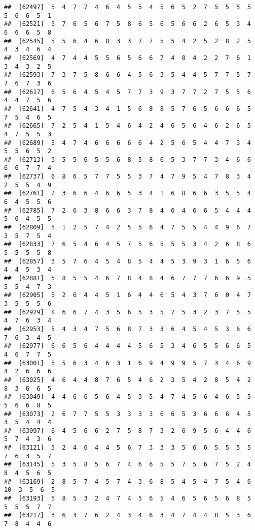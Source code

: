 \documentclass[
]{book}
\begin{document}
\begin{verbatim}
##  [62497]  5  4  7  7  4  6  4  5  5  4  5  6  5  2  7  5  5  5  5  5  6  6  5  1
##  [62521]  3  7  6  5  6  7  5  8  6  5  6  5  6  6  2  6  5  3  4  6  6  6  5  8
##  [62545]  5  5  6  4  6  8  3  3  7  7  5  5  4  2  5  2  8  2  5  4  3  4  6  4
##  [62569]  4  7  4  4  5  5  6  5  6  6  7  4  8  4  2  2  7  6  1  3  4  3  2  5
##  [62593]  7  3  7  5  8  6  6  4  5  6  3  5  4  4  5  7  7  5  7  7  6  7  3  6
##  [62617]  6  5  6  4  5  4  5  7  7  3  9  3  7  7  2  7  5  5  6  4  4  7  5  6
##  [62641]  4  7  5  4  3  4  1  5  6  8  8  5  7  6  5  6  6  6  5  7  5  4  6  5
##  [62665]  7  2  5  4  1  5  4  6  4  2  4  6  5  6  4  6  2  6  5  4  7  5  5  3
##  [62689]  5  4  7  4  6  6  6  6  6  4  2  5  6  5  4  4  7  3  4  5  5  6  5  2
##  [62713]  3  5  5  6  5  5  6  8  5  8  6  5  3  7  7  3  4  6  6  6  6  7  7  4
##  [62737]  6  8  6  5  7  7  5  5  3  7  4  7  9  5  4  7  8  3  4  2  5  5  4  9
##  [62761]  2  3  6  6  4  6  6  5  3  4  1  6  8  6  6  3  5  5  4  6  4  5  5  6
##  [62785]  7  2  6  3  8  6  6  3  7  8  4  6  4  6  6  5  4  4  4  5  6  4  5  5
##  [62809]  5  1  2  5  7  4  2  5  5  6  4  7  5  5  4  4  9  6  7  3  5  7  5  4
##  [62833]  7  6  5  4  6  4  5  7  5  6  5  5  5  3  4  2  6  8  6  5  5  5  5  8
##  [62857]  3  5  7  6  4  5  4  8  5  4  4  5  3  9  3  1  6  5  6  4  4  5  3  4
##  [62881]  5  8  5  5  4  6  7  8  4  8  4  6  7  7  7  6  6  9  5  5  5  4  7  3
##  [62905]  5  2  6  4  4  5  1  6  4  4  6  5  4  3  7  6  0  4  7  3  5  5  5  6
##  [62929]  8  6  6  7  4  3  5  6  5  3  5  7  5  3  2  3  7  5  5  4  7  6  3  4
##  [62953]  5  4  3  4  7  5  6  8  7  3  3  6  4  5  4  5  3  6  6  7  6  3  4  5
##  [62977]  6  6  5  6  4  4  4  4  5  6  5  3  4  6  5  5  6  6  5  4  6  7  7  5
##  [63001]  5  5  6  3  4  6  3  1  6  9  4  9  9  5  7  3  4  6  9  4  2  6  6  6
##  [63025]  4  6  4  4  8  7  6  5  4  6  2  3  5  4  2  8  5  4  2  8  3  6  6  5
##  [63049]  4  4  6  6  5  6  4  5  3  5  4  7  4  5  6  4  6  5  5  5  6  6  8  5
##  [63073]  2  6  7  7  5  5  3  3  3  3  6  6  5  3  6  6  6  4  5  3  5  4  4  4
##  [63097]  6  4  5  6  6  2  7  5  8  7  3  2  6  9  5  6  4  4  6  5  7  4  3  6
##  [63121]  5  2  4  6  4  4  5  6  7  3  3  3  5  6  6  5  5  5  5  7  6  3  5  7
##  [63145]  5  3  5  8  5  6  7  4  6  6  5  5  7  5  6  7  5  2  4  8  4  5  6  5
##  [63169]  2  8  5  7  4  5  7  4  3  6  8  5  4  5  4  7  5  4  6 10  3  5  6  5
##  [63193]  5  8  5  3  2  4  7  4  5  6  5  4  6  5  6  5  6  8  5  5  5  5  7  7
##  [63217]  3  6  3  7  6  2  4  3  4  6  3  4  7  4  4  8  5  3  6  7  8  4  4  6

\end{verbatim}
\end{document}
